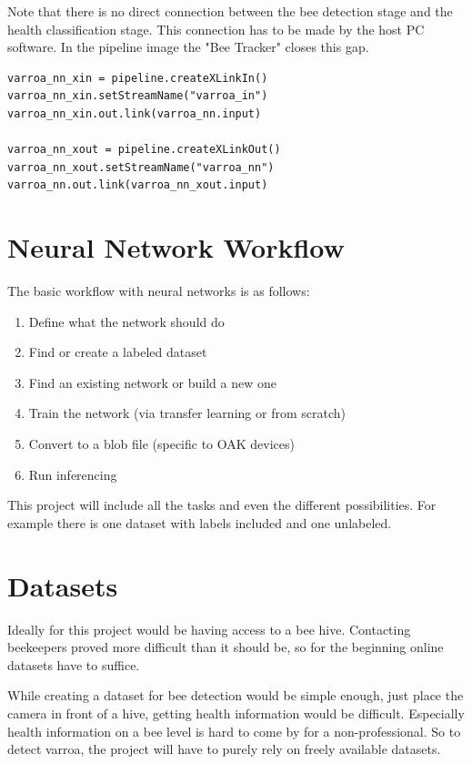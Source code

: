 \documentclass[a4paper,titlepage]{article}
\begin{document}
Note that there is no direct connection between the bee detection stage and the health classification stage.
This connection has to be made by the host PC software.
In the pipeline image the "Bee Tracker" closes this gap.

\begin{lstlisting}
varroa_nn_xin = pipeline.createXLinkIn()
varroa_nn_xin.setStreamName("varroa_in")
varroa_nn_xin.out.link(varroa_nn.input)

varroa_nn_xout = pipeline.createXLinkOut()
varroa_nn_xout.setStreamName("varroa_nn")
varroa_nn.out.link(varroa_nn_xout.input)
\end{lstlisting}

\newpage
\section{Neural Network Workflow}

The basic workflow with neural networks is as follows:

\begin{enumerate}
    \item Define what the network should do
    \item Find or create a labeled dataset
    \item Find an existing network or build a new one
    \item Train the network (via transfer learning or from scratch)
    \item Convert to a blob file (specific to OAK devices)
    \item Run inferencing
\end{enumerate} 

This project will include all the tasks and even the different possibilities.
For example there is one dataset with labels included and one unlabeled.

\newpage
\section{Datasets}

Ideally for this project would be having access to a bee hive.
Contacting beekeepers proved more difficult than it should be, so for the beginning online datasets have to suffice.

While creating a dataset for bee detection would be simple enough, just place the camera in front of a hive, getting health information would be difficult.
Especially health information on a bee level is hard to come by for a non-professional.
So to detect varroa, the project will have to purely rely on freely available datasets.
\end{document}
